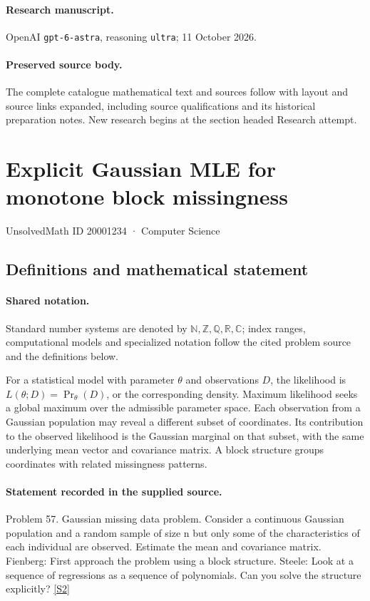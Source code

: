 \documentclass[11pt]{article}
\begin{document}
\paragraph{Research manuscript.} OpenAI \texttt{gpt-6-astra}, reasoning \texttt{ultra}; 11 October 2026.
\paragraph{Preserved source body.} The complete catalogue mathematical text and sources follow with layout and source links expanded, including source qualifications and its historical preparation notes. New research begins at the section headed Research attempt.

\section{Explicit Gaussian MLE for monotone block missingness}\label{20001234}
{\small UnsolvedMath ID 20001234 · Computer Science}
\subsection{Definitions and mathematical statement}

\paragraph{Shared notation.}Standard number systems are denoted by $\mathbb N,\mathbb Z,\mathbb Q,\mathbb R,\mathbb C$; index ranges, computational models and specialized notation follow the cited problem source and the definitions below.


For a statistical model with parameter $\theta$ and observations $D$, the likelihood is $L(\theta;D)=\Pr_\theta(D)$, or the corresponding density. Maximum likelihood seeks a global maximum over the admissible parameter space. Each observation from a Gaussian population may reveal a different subset of coordinates. Its contribution to the observed likelihood is the Gaussian marginal on that subset, with the same underlying mean vector and covariance matrix. A block structure groups coordinates with related missingness patterns.
\paragraph{Statement recorded in the supplied source.}
Problem 57. Gaussian missing data problem. Consider a continuous Gaussian population and a random sample of size n but only some of the characteristics of each individual are observed. Estimate the mean and covariance matrix. Fienberg: First approach the problem using a block structure. Steele: Look at a sequence of regressions as a sequence of polynomials. Can you solve the structure explicitly? \href{https://aimath.org/WWN/compalgstat/compalgstat.pdf}{[S2]}
\end{document}
